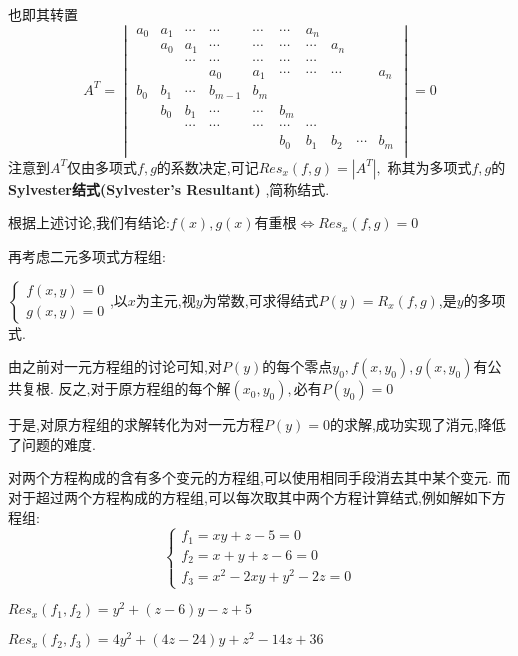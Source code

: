 	也即其转置
	\[A^{T}= \begin{vmatrix}
	a_0 & a_1 & \cdots & \cdots & \cdots & \cdots & a_n		&		&	&   \\
		& a_0 & a_1	   & \cdots & \cdots & \cdots & \cdots  &a_n   &	&	\\
		&	  & \cdots & \cdots & \cdots & \cdots & \cdots &		&	&	\\
		&	  &		   & a_0	& a_1	 & \cdots & \cdots & \cdots &	& a_n\\
	b_0 & b_1 & \cdots & b_{m-1}& b_m		 &		  &		   &		&	&   \\
		& b_0 & b_1	   & \cdots  &\cdots &b_m   	&		&		&	&	\\
		&	  & \cdots & \cdots & \cdots & \cdots & \cdots &		&	&	\\
		&	  &		   &		&		&   b_0   & b_1		& b_2	& \cdots & b_m\\
	\end{vmatrix} =0\]
	注意到$ A^{T}$仅由多项式$ f,g$的系数决定,可记$ Res_x(f,g)=|A^{T}|,$
	称其为多项式$ f,g$的{\bf Sylvester结式(Sylvester's Resultant) },简称结式.

	根据上述讨论,我们有结论:$ f(x),g(x)$有重根$ \Leftrightarrow Res_x(f,g) = 0$
	
	\vspace{13pt}
	再考虑二元多项式方程组:

	$ \begin{cases}
		f(x,y)=0 \\g(x,y)=0 
	\end{cases}$,以$ x$为主元,视$ y$为常数,可求得结式$ P(y) = R_x(f,g)$,是$ y$的多项式.

	由之前对一元方程组的讨论可知,对$ P(y)$的每个零点$ y_0,f(x,y_0),g(x,y_0)$有公共复根.
	反之,对于原方程组的每个解$ (x_0,y_0), $必有$ P(y_0) = 0$

	于是,对原方程组的求解转化为对一元方程$ P(y) = 0$的求解,成功实现了消元,降低了问题的难度.
	
	\vspace{13pt}
	对两个方程构成的含有多个变元的方程组,可以使用相同手段消去其中某个变元.
	而对于超过两个方程构成的方程组,可以每次取其中两个方程计算结式,例如解如下方程组:
	\[  \begin{cases} f_1 = xy+z-5 = 0\\ f_2 = x+y+z-6 = 0 \\ f_3 = x^2-2xy+y^2-2z = 0
	\end{cases}\]

	$ Res_x(f_1,f_2) = y^2+(z-6)y-z+5 $ 

	$ Res_x(f_2,f_3)=4y^2+(4z-24)y + z^2-14z+36$

